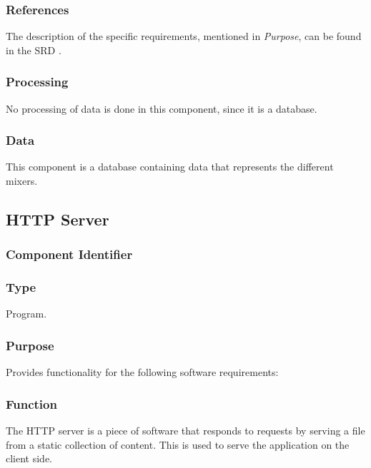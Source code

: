 \subsubsection*{References}
The description of the specific requirements, mentioned in \emph{Purpose}, can be found in the SRD \cite{srd}.

\subsubsection*{Processing}
No processing of data is done in this component, since it is a database.

\subsubsection*{Data}
This component is a database containing data that represents the different mixers.

\subsection{HTTP Server}
\label{subsec:httpserver}

\subsubsection*{Component Identifier}
\RTMSHS{}

\subsubsection*{Type}
Program.

\subsubsection*{Purpose}
Provides functionality for the following software requirements:

\noindent {}

\subsubsection*{Function}
The HTTP server is a piece of software that responds to requests by serving a file from a static collection of content. This is used to serve the application on the client side.

